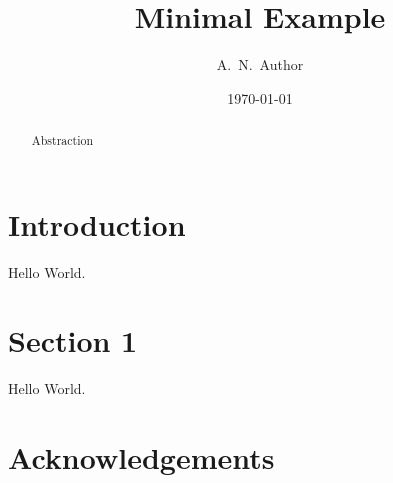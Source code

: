 \documentclass[modern]{mnras}
\begin{document}
\title{Minimal Example}
\author{A.\ N.\ Author}
\date{\today}

\maketitle

\begin{abstract}
  Abstraction
\end{abstract}



\section{Introduction}
Hello World.

\section{Section 1}
Hello World.

\section*{Acknowledgements}



\end{document}
